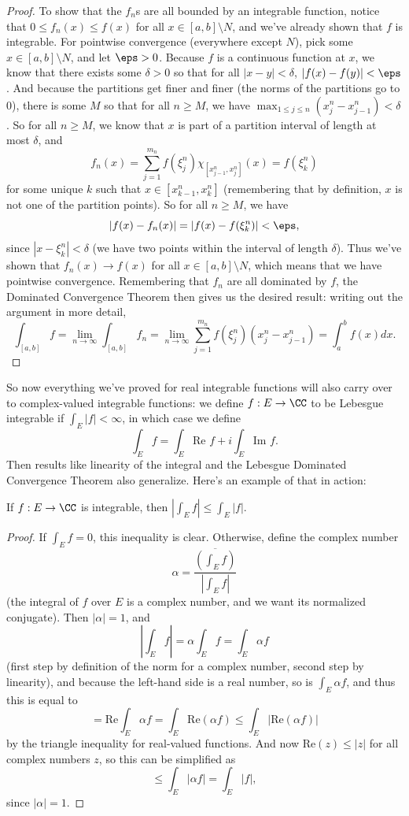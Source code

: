 \begin{proof}
To show that the $f_n$s are all bounded by an integrable function, notice that $0 \le f_n(x) \le f(x)$ for all $x \in [a, b] \setminus N$, and we've already shown that $f$ is integrable. For pointwise convergence (everywhere except $N$), pick some $x \in [a, b] \setminus N$, and let $\eps > 0$. Because $f$ is a continuous function at $x$, we know that there exists some $\delta > 0$ so that for all $|x-y| < \delta$, $|f(x) - f(y)| < \eps$. And because the partitions get finer and finer (the norms of the partitions go to $0$), there is some $M$ so that for all $n \ge M$, we have $\max_{1 \le j \le n} (x_j^n - x_{j-1}^n) < \delta$. So for all $n \ge M$, we know that $x$ is part of a partition interval of length at most $\delta$, and 
\[
    f_n(x) = \sum_{j=1}^{m_n} f(\xi_j^n) \chi_{[x_{j-1}^n, x_j^n]}(x) = f(\xi_k^n)
\]
for some unique $k$ such that $x \in [x_{k-1}^n, x_k^n]$ (remembering that by definition, $x$ is not one of the partition points). So for all $n \ge M$, we have 
\[
    |f(x) - f_n(x)| = |f(x) - f(\xi_k^n)| < \eps,
\]
since $|x - \xi_k^n| < \delta$ (we have two points within the interval of length $\delta$). Thus we've shown that $f_n(x) \to f(x)$ for all $x \in [a, b] \setminus N$, which means that we have pointwise convergence. Remembering that $f_n$ are all dominated by $f$, the Dominated Convergence Theorem then gives us the desired result: writing out the argument in more detail,
\[
    \int_{[a, b]} f = \lim_{n \to \infty} \int_{[a, b]} f_n = \lim_{n \to \infty} \sum_{j=1}^{m_n} f(\xi_j^n) (x_j^n - x_{j-1}^n) = \int_a^b f(x) dx.
\]
\end{proof}

So now everything we've proved for real integrable functions will also carry over to complex-valued integrable functions: we define $f: E \to \CC$ to be Lebesgue integrable if $\int_E |f| < \infty$, in which case we define 
\[
    \int_E f = \int_E \text{Re } f + i \int_E \text{Im } f.
\]
Then results like linearity of the integral and the Lebesgue Dominated Convergence Theorem also generalize. Here's an example of that in action:

\begin{proposition}
If $f: E \to \CC$ is integrable, then $\left|\int_E f\right| \le \int_E |f|$.
\end{proposition}
\begin{proof}
If $\int_E f = 0$, this inequality is clear. Otherwise, define the complex number 
\[
    \alpha = \frac{\overline{\left(\int_E f\right)}}{\left|\int_E f\right|}
\]
(the integral of $f$ over $E$ is a complex number, and we want its normalized conjugate). Then $|\alpha| = 1$, and 
\[
    \left|\int_E f\right| = \alpha \int_E f = \int_E \alpha f
\]
(first step by definition of the norm for a complex number, second step by linearity), and because the left-hand side is a real number, so is $\int_E \alpha f$, and thus this is equal to 
\[
    = \text{Re} \int_E \alpha f = \int_E \text{Re}(\alpha f) \le \int_E \left|\text{Re}(\alpha f)\right|  
\]
by the triangle inequality for real-valued functions. And now $\text{Re}(z) \le |z|$ for all complex numbers $z$, so this can be simplified as
\[
    \le \int_E |\alpha f| = \int_E |f|,
\]
since $|\alpha| = 1$.
\end{proof}

